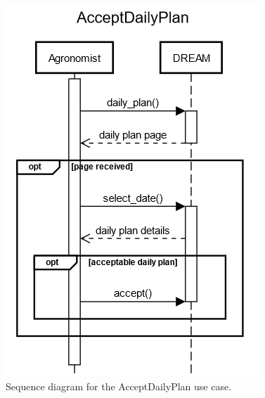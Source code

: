 \documentclass{article}
\begin{document}
\begin{figure}[H]
    \centering
    \includegraphics[scale=0.75]{sequence_diagrams/AcceptDailyPlan.png}
    \caption{Sequence diagram for the AcceptDailyPlan use case.}
\end{figure}
\newpage
\end{document}
